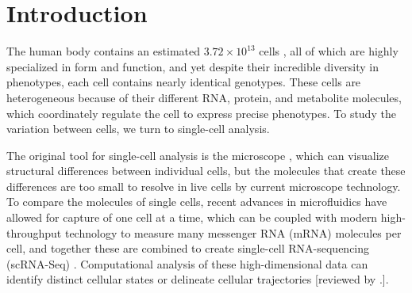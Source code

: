 






\section{Introduction}
The human body contains an estimated $3.72\times 10^{13}$ cells \cite{Bianconi2013-jr}, all of which are highly specialized in form and function, and yet despite their incredible diversity in phenotypes, each cell contains nearly identical genotypes. These cells are heterogeneous because of their different RNA, protein, and metabolite molecules, which coordinately regulate the cell to express precise phenotypes. To study the variation between cells, we turn to single-cell analysis.

The original tool for single-cell analysis is the microscope \cite{Hooke1665-bk,Van_Leeuwenhoek_undated-gu}, which can visualize structural differences between individual cells, but the molecules that create these differences are too small to resolve in live cells by current microscope technology. To compare the molecules of single cells, recent advances in microfluidics have allowed for capture of one cell at a time, which can be coupled with modern high-throughput technology to measure many messenger RNA (mRNA) molecules per cell, and together these are combined to create single-cell RNA-sequencing (scRNA-Seq) \cite{Kolodziejczyk:2015dj,Ziegenhain:2017kr}. Computational analysis of these high-dimensional data can identify distinct cellular states or delineate cellular trajectories [reviewed by \cite{Bacher:2016jq,Cannoodt2016-mt,Liu:2016fd,Trapnell:2015er,Stegle:2015cx}.].

